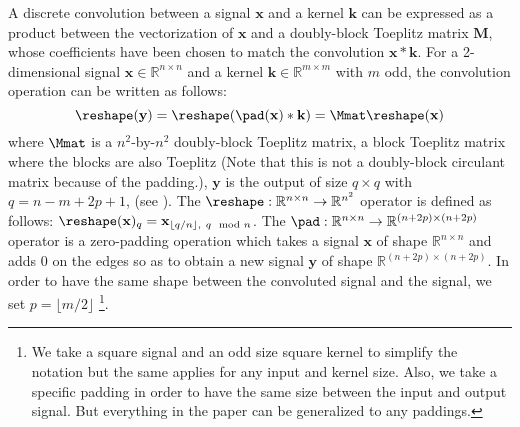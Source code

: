 A discrete convolution between a signal $\mathbf{x}$ and a kernel $\mathbf{k}$ can be expressed as a product between the vectorization of $\mathbf{x}$ and a doubly-block Toeplitz matrix $\textbf{M}$, whose coefficients have been chosen to match the convolution $\mathbf{x} * \mathbf{k}$.
For a 2-dimensional signal $\mathbf{x} \in \mathbb{R}^{n \times n}$ and a kernel $\mathbf{k} \in \mathbb{R}^{m \times m}$ with $m$ odd, the convolution operation can be written as follows:
\begin{equation} \label{equation:equation_conv_as_matrix}
    \reshape(\mathbf{y}) = \reshape(\pad(\mathbf{x}) * \mathbf{k}) = \Mmat \reshape(\mathbf{x})
\end{equation}
where $\Mmat$ is a $n^2$-by-$n^2$  doubly-block Toeplitz matrix, \ie a block Toeplitz matrix where the blocks are also Toeplitz (Note that this is not a doubly-block circulant matrix because of the padding.), $\mathbf{y}$ is the output of size $q \times q$ with $q = n - m + 2p + 1$, (see \eg \cite{dumoulin2016guide}).
The $\reshape: \mathbb{R}^{n \times n} \rightarrow \mathbb{R}^{n^2}$ operator is defined as follows: $\reshape(\mathbf{x})_q = \mathbf{x}_{\lfloor q/n \rfloor,\ q\mod n}$.
The $\pad: \mathbb{R}^{n \times n} \rightarrow \mathbb{R}^{(n+2p) \times (n+2p)}$ operator is a zero-padding operation which takes a signal $\mathbf{x}$ of shape $\mathbb{R}^{n \times n}$ and adds $0$ on the edges so as to obtain a new signal $\mathbf{y}$ of shape $\mathbb{R}^{(n+2p) \times (n+2p)}$.
In order to have the same shape between the convoluted signal and the signal, we set $ p = \lfloor m/2 \rfloor$ \footnote{We take a square signal and an odd size square kernel to simplify the notation but the same applies for any input and kernel size.
Also, we take a specific padding in order to have the same size between the input and output signal.
But everything in the paper can be generalized to any paddings.}.

